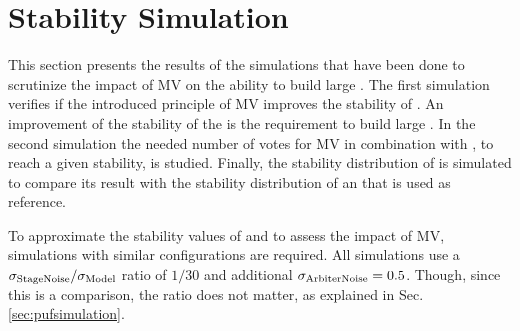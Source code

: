\chapter{Stability Simulation}
\label{cap:stabilitysimulation}

This section presents the results of the simulations that have been done to scrutinize the impact of \ac{MV} on the ability to build large \mxpufs.
The first simulation verifies if the introduced principle of \ac{MV} improves the stability of \apuf.
An improvement of the stability of the \apufs is the requirement to build large \xpufs.
In the second simulation the needed number of votes for \ac{MV} in combination with \xpufs, to reach a given stability, is studied.
Finally, the stability distribution of \mxpufs is simulated to compare its result with the stability distribution of an \apuf that is used as reference.

To approximate the stability values of \pufs and to assess the impact of \ac{MV}, simulations with similar configurations are required.
All simulations use a $\sigma_{\mathrm{Stage Noise}}/\sigma_{\mathrm{Model}}$ ratio of $1/30$ and additional $\sigma_{\mathrm{Arbiter Noise}} = 0.5$.
Though, since this is a comparison, the ratio does not matter, as explained in Sec. \ref{sec:pufsimulation}.


